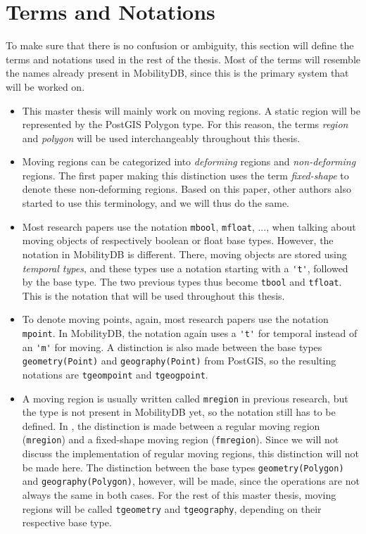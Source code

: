 \section{Terms and Notations}

To make sure that there is no confusion or ambiguity, this section will define the terms and notations used in the rest of the thesis. Most of the terms will resemble the names already present in MobilityDB, since this is the primary system that will be worked on.

\begin{itemize}
    \item This master thesis will mainly work on moving regions. A static region will be represented by the PostGIS Polygon type. For this reason, the terms \textit{region} and \textit{polygon} will be used interchangeably throughout this thesis.

    \item Moving regions can be categorized into \textit{deforming} regions and \textit{non-deforming} regions. The first paper \cite{fmregion} making this distinction uses the term \textit{fixed-shape} to denote these non-deforming regions. Based on this paper, other authors \cite{modeling_and_representing, polyhedra} also started to use this terminology, and we will thus do the same.

    \item Most research papers use the notation \lstinline{mbool}, \lstinline{mfloat}, ..., when talking about moving objects of respectively boolean or float base types. However, the notation in MobilityDB is different. There, moving objects are stored using \textit{temporal types}, and these types use a notation starting with a \lstinline{'t'}, followed by the base type. The two previous types thus become \lstinline{tbool} and \lstinline{tfloat}. This is the notation that will be used throughout this thesis.

    \item To denote moving points, again, most research papers use the notation \lstinline{mpoint}. In MobilityDB, the notation again uses a \lstinline{'t'} for temporal instead of an \lstinline{'m'} for moving. A distinction is also made between the base types \lstinline{geometry(Point)} and \lstinline{geography(Point)} from PostGIS, so the resulting notations are \lstinline{tgeompoint} and \lstinline{tgeogpoint}.

    \item A moving region is usually written called \lstinline{mregion} in previous research, but the type is not present in MobilityDB yet, so the notation still has to be defined. In \cite{fmregion}, the distinction is made between a regular moving region (\lstinline{mregion}) and a fixed-shape moving region (\lstinline{fmregion}). Since we will not discuss the implementation of regular moving regions, this distinction will not be made here. The distinction between the base types \lstinline{geometry(Polygon)} and \lstinline{geography(Polygon)}, however, will be made, since the operations are not always the same in both cases. For the rest of this master thesis, moving regions will be called \lstinline{tgeometry} and \lstinline{tgeography}, depending on their respective base type.


\end{itemize}
